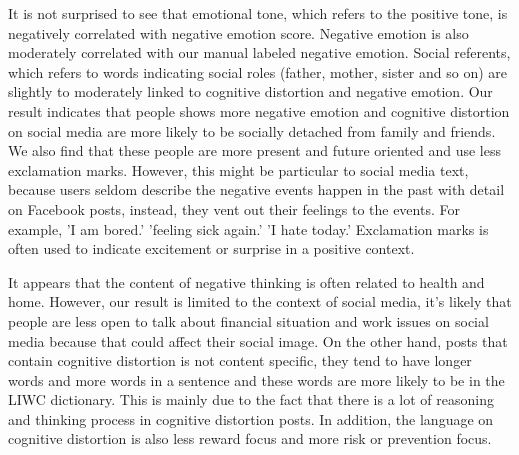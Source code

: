 It is not surprised to see that emotional tone, which refers to the positive tone, is negatively correlated with negative emotion score. Negative emotion is also moderately correlated with our manual labeled negative emotion. Social referents, which refers to words indicating social roles (father, mother, sister and so on) are slightly to moderately linked to cognitive distortion and negative emotion. Our result indicates that people shows more negative emotion and cognitive distortion on social media are more likely to be socially detached from family and friends.  We also find that these people are more present and future oriented and use less exclamation marks. However, this might be particular to social media text, because users seldom describe the negative events happen in the past with detail on Facebook posts, instead, they vent out their feelings to the events. For example, 'I am bored.' 'feeling sick again.' 'I hate today.' Exclamation marks is often used to indicate excitement or surprise in a positive context.

It appears that the content of negative thinking is often related to health and home. However, our result is limited to the context of social media, it's likely that people are less open to talk about financial situation and work issues on social media because that could affect their social image. On the other hand, posts that contain cognitive distortion is not content specific, they tend to have longer words and more words in a sentence and these words are more likely to be in the LIWC dictionary. This is mainly due to the fact that there is a lot of reasoning and thinking process in cognitive distortion posts. In addition, the language on cognitive distortion is also less reward focus and more risk or prevention focus.

